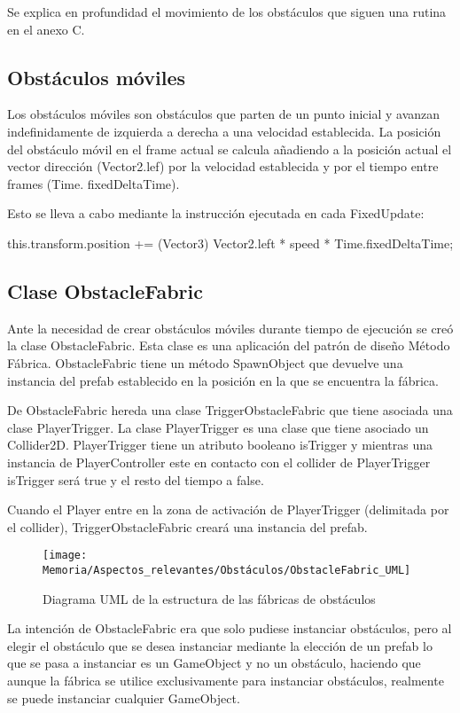Se explica en profundidad el movimiento de los obstáculos que siguen una rutina en el anexo C.

\subsection{Obstáculos móviles}
Los obstáculos móviles son obstáculos que parten de un punto inicial y avanzan indefinidamente de izquierda a derecha a una velocidad establecida. La posición del obstáculo móvil en el frame actual se calcula añadiendo a la posición actual el vector dirección (Vector2.lef) por la velocidad establecida y por el tiempo entre frames (Time. fixedDeltaTime).

Esto se lleva a cabo mediante la instrucción ejecutada en cada FixedUpdate:

this.transform.position += (Vector3) Vector2.left * speed * Time.fixedDeltaTime;

\subsection{Clase ObstacleFabric}
Ante la necesidad de crear obstáculos móviles durante tiempo de ejecución se creó la clase ObstacleFabric. Esta clase es una aplicación del patrón de diseño Método Fábrica. ObstacleFabric tiene un método SpawnObject que devuelve una instancia del prefab establecido en la posición en la que se encuentra la fábrica.

De ObstacleFabric hereda una clase TriggerObstacleFabric que tiene asociada una clase PlayerTrigger. La clase PlayerTrigger es una clase que tiene asociado un Collider2D. PlayerTrigger tiene un atributo booleano isTrigger y mientras una instancia de PlayerController este en contacto con el collider de PlayerTrigger isTrigger será true y el resto del tiempo a false.

Cuando el Player entre en la zona de activación de PlayerTrigger (delimitada por el collider), TriggerObstacleFabric creará una instancia del prefab.

\begin{figure}[h]
\centering
\texttt{[image: Memoria/Aspectos\_relevantes/Obstáculos/ObstacleFabric\_UML]}
\caption{Diagrama UML de la estructura de las fábricas de obstáculos}
\end{figure}

La intención de ObstacleFabric era que solo pudiese instanciar obstáculos, pero al elegir el obstáculo que se desea instanciar mediante la elección de un prefab lo que se pasa a instanciar es un GameObject y no un obstáculo, haciendo que aunque la fábrica se utilice exclusivamente para instanciar obstáculos, realmente se puede instanciar cualquier GameObject.

